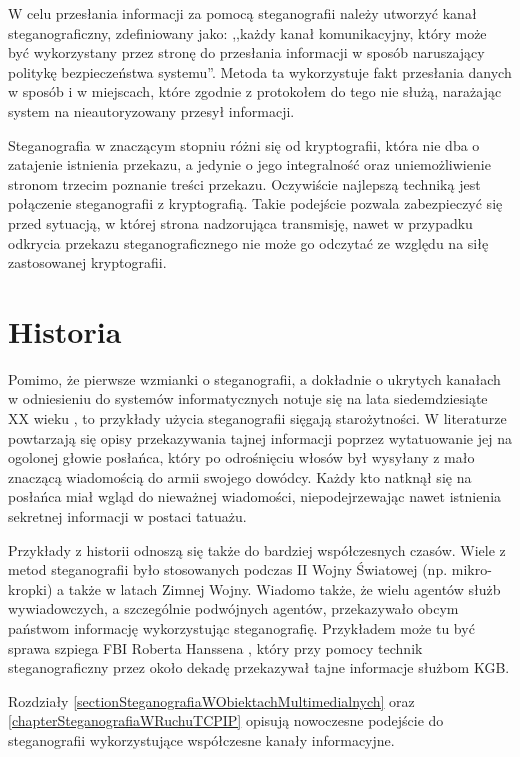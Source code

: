 \documentclass[a4paper,12pt,twoside,openany]{report}
\begin{document}
W celu przesłania informacji za pomocą steganografii należy utworzyć kanał 
steganograficzny, zdefiniowany \cite{USDoD}  jako: ,,każdy kanał komunikacyjny, 
który może być wykorzystany przez stronę do przesłania informacji w sposób 
naruszający politykę bezpieczeństwa systemu''. Metoda ta wykorzystuje fakt 
przesłania danych w sposób i w miejscach, które zgodnie z protokołem do tego nie 
służą, narażając system na nieautoryzowany przesył informacji.

Steganografia w znaczącym stopniu różni się od kryptografii, która nie dba o 
zatajenie istnienia przekazu, a jedynie o jego integralność oraz uniemożliwienie 
stronom trzecim poznanie treści przekazu. Oczywiście najlepszą techniką jest 
połączenie steganografii z kryptografią. Takie podejście pozwala zabezpieczyć 
się przed sytuacją, w której strona nadzorująca transmisję, nawet w przypadku 
odkrycia przekazu steganograficznego nie może go odczytać ze względu na siłę 
zastosowanej kryptografii.
\section{Historia}
Pomimo, że pierwsze wzmianki o steganografii, a dokładnie o ukrytych kanałach w 
odniesieniu do systemów informatycznych notuje się na lata siedemdziesiąte XX 
wieku \cite{FirstCC}, to przykłady użycia steganografii sięgają starożytności. W 
literaturze powtarzają się opisy przekazywania tajnej informacji poprzez 
wytatuowanie jej na ogolonej głowie posłańca, który po odrośnięciu włosów był 
wysyłany z mało znaczącą wiadomością do armii swojego dowódcy. Każdy kto natknął 
się na posłańca miał wgląd do nieważnej wiadomości, niepodejrzewając nawet 
istnienia sekretnej informacji w postaci tatuażu.

Przykłady z historii odnoszą się także do bardziej współczesnych czasów. Wiele z 
metod steganografii było stosowanych podczas II Wojny Światowej (np. 
mikro-kropki) a także w latach Zimnej Wojny. Wiadomo także, że wielu agentów 
służb wywiadowczych, a szczególnie podwójnych agentów, przekazywało obcym 
państwom informację wykorzystując steganografię. Przykładem może tu być sprawa 
szpiega FBI Roberta Hanssena \cite{Hanssen}, który przy pomocy technik 
steganograficzny przez około dekadę przekazywał tajne informacje służbom KGB.

Rozdziały \ref{sectionSteganografiaWObiektachMultimedialnych} oraz 
\ref{chapterSteganografiaWRuchuTCPIP} opisują nowoczesne podejście do 
steganografii wykorzystujące współczesne kanały informacyjne. 
\end{document}
